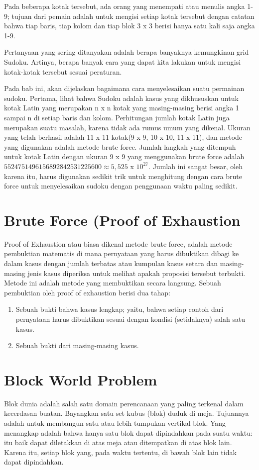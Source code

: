 \documentclass[11pt,a4paper]{report}
\begin{document}
\indent Pada beberapa kotak tersebut, ada orang yang menempati atau menulis angka 1-9; tujuan dari pemain adalah untuk mengisi setiap kotak tersebut dengan catatan bahwa tiap baris, tiap kolom dan tiap blok 3 x 3 berisi hanya satu kali saja angka 1-9.

\indent Pertanyaan yang sering ditanyakan adalah berapa banyaknya kemungkinan grid Sudoku. Artinya, berapa banyak cara yang dapat kita lakukan untuk mengisi kotak-kotak tersebut sesuai peraturan.

\indent Pada bab ini, akan dijelaskan bagaimana cara menyelesaikan suatu permainan sudoku. Pertama, lihat bahwa Sudoku adalah kasus yang dikhususkan untuk kotak Latin yang merupakan n x n kotak yang masing-masing berisi angka 1 sampai n di setiap baris dan kolom. Perhitungan jumlah kotak Latin juga merupakan suatu masalah, karena tidak ada rumus umum yang dikenal. Ukuran yang telah berhasil adalah 11 x 11 kotak(9 x 9, 10 x 10, 11 x 11), dan metode yang digunakan adalah metode brute force. Jumlah langkah yang ditempuh untuk kotak Latin dengan ukuran 9 x 9 yang menggunakan brute force adalah $5524751496156892842531225600 \approx 5,525$ x $10^{27}$. Jumlah ini sangat besar, oleh karena itu, harus digunakan sedikit trik untuk menghitung dengan cara brute force untuk menyelesaikan sudoku dengan penggunaan waktu paling sedikit.

\section{Brute Force (Proof of Exhaustion}
Proof of Exhaustion atau biasa dikenal metode brute force, adalah metode pembuktian matematis di mana pernyataan yang harus dibuktikan dibagi ke dalam kasus dengan jumlah terbatas atau kumpulan kasus setara dan masing-masing jenis kasus diperiksa untuk melihat apakah proposisi tersebut terbukti. Metode ini adalah metode yang membuktikan secara langsung. Sebuah pembuktian oleh proof of exhaustion berisi dua tahap:

\begin{enumerate}
	\item Sebuah bukti bahwa kasus lengkap; yaitu, bahwa setiap contoh dari pernyataan harus dibuktikan sesuai dengan kondisi (setidaknya) salah satu kasus.
	\item Sebuah bukti dari masing-masing kasus.
\end{enumerate}

\section{Block World Problem}
Blok dunia adalah salah satu domain perencanaan yang paling terkenal dalam kecerdasan buatan. Bayangkan satu set kubus (blok) duduk di meja. Tujuannya adalah untuk membangun satu atau lebih tumpukan vertikal blok. Yang menangkap adalah bahwa hanya satu blok dapat dipindahkan pada suatu waktu: itu baik dapat diletakkan di atas meja atau ditempatkan di atas blok lain. Karena itu, setiap blok yang, pada waktu tertentu, di bawah blok lain tidak dapat dipindahkan.
\end{document}
